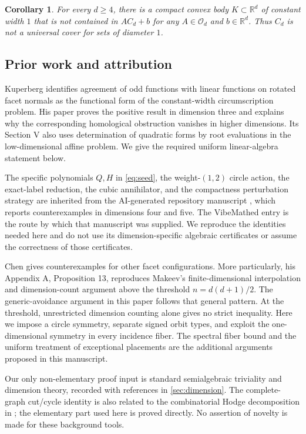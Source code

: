 \documentclass[11pt,reqno]{amsart}
\newtheorem{corollary}[corollary]{Corollary}
\theoremstyle{definition}
\theoremstyle{remark}
\numberwithin{equation}{section}
\newcommand{\R}{\mathbb R}
\newcommand{\Orth}{\mathcal O_d}
\begin{document}
\begin{corollary}\label{cor:cover}
For every $d\geq4$, there is a compact convex body $K\subset\R^d$
of constant width $1$ that is not contained in $A C_d+b$ for any
$A\in\Orth$ and $b\in\R^d$. Thus $C_d$ is not a universal cover for
sets of diameter $1$.
\end{corollary}

\subsection{Prior work and attribution}
Kuperberg \cite[Section I, Proposition 1]{Kuperberg1999} identifies
agreement of odd functions with linear functions on rotated facet
normals as the functional form of the constant-width circumscription
problem. His paper proves the positive result in dimension three and
explains why the corresponding homological obstruction vanishes in
higher dimensions. Its Section V also uses determination of quadratic
forms by root evaluations in the low-dimensional affine problem.
We give the required uniform linear-algebra statement below.

The specific polynomials $Q,H$ in \eqref{eq:seed}, the weight-$(1,2)$
circle action, the exact-label reduction, the cubic annihilator, and the
compactness perturbation strategy are inherited from the AI-generated
repository manuscript \cite{ChatGPT2026}, which reports counterexamples
in dimensions four and five. The VibeMathed entry \cite{VibeMathed2026}
is the route by which that manuscript was supplied. We reproduce the
identities needed here and do not use its dimension-specific algebraic
certificates or assume the correctness of those certificates.

Chen \cite[Section 2]{Chen2026} gives counterexamples for other facet
configurations. More particularly, his Appendix A, Proposition 13,
reproduces Makeev's finite-dimensional interpolation and dimension-count
argument above the threshold $n=d(d+1)/2$. The generic-avoidance argument
in this paper follows that general pattern. At the threshold,
unrestricted dimension counting alone gives no strict inequality.
Here we impose a circle symmetry, separate signed orbit types, and
exploit the one-dimensional symmetry in every incidence fiber.
The spectral fiber bound and the uniform treatment of exceptional
placements are the additional arguments proposed in this manuscript.

Our only non-elementary proof input is standard semialgebraic
triviality and dimension theory, recorded with references in
\cref{sec:dimension}. The complete-graph cut/cycle identity is also
related to the combinatorial Hodge decomposition in
\cite{JiangLimYaoYe2011}; the elementary part used here is proved directly.
No assertion of novelty is made for these background tools.
\end{document}
